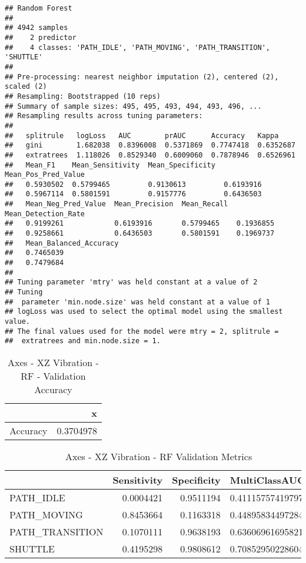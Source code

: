 \documentclass[]{article}
\begin{document}
\begin{verbatim}
## Random Forest 
## 
## 4942 samples
##    2 predictor
##    4 classes: 'PATH_IDLE', 'PATH_MOVING', 'PATH_TRANSITION', 'SHUTTLE' 
## 
## Pre-processing: nearest neighbor imputation (2), centered (2), scaled (2) 
## Resampling: Bootstrapped (10 reps) 
## Summary of sample sizes: 495, 495, 493, 494, 493, 496, ... 
## Resampling results across tuning parameters:
## 
##   splitrule   logLoss   AUC        prAUC      Accuracy   Kappa    
##   gini        1.682038  0.8396008  0.5371869  0.7747418  0.6352687
##   extratrees  1.118026  0.8529340  0.6009060  0.7878946  0.6526961
##   Mean_F1    Mean_Sensitivity  Mean_Specificity  Mean_Pos_Pred_Value
##   0.5930502  0.5799465         0.9130613         0.6193916          
##   0.5967114  0.5801591         0.9157776         0.6436503          
##   Mean_Neg_Pred_Value  Mean_Precision  Mean_Recall  Mean_Detection_Rate
##   0.9199261            0.6193916       0.5799465    0.1936855          
##   0.9258661            0.6436503       0.5801591    0.1969737          
##   Mean_Balanced_Accuracy
##   0.7465039             
##   0.7479684             
## 
## Tuning parameter 'mtry' was held constant at a value of 2
## Tuning
##  parameter 'min.node.size' was held constant at a value of 1
## logLoss was used to select the optimal model using the smallest value.
## The final values used for the model were mtry = 2, splitrule =
##  extratrees and min.node.size = 1.
\end{verbatim}

\begin{table}[!h]

\caption{\label{tab:sensor-xz-vib-rf-results}Axes - XZ Vibration - RF - Validation Accuracy}
\centering
\begin{tabular}[t]{lr}
\toprule
  & x\\
\midrule
Accuracy & 0.3704978\\
\bottomrule
\end{tabular}
\end{table}

\begin{table}[!h]

\caption{\label{tab:sensor-xz-vib-rf-results}Axes - XZ Vibration - RF Validation Metrics}
\centering
\begin{tabular}[t]{lrrl}
\toprule
  & Sensitivity & Specificity & MultiClassAUC\\
\midrule
PATH\_IDLE & 0.0004421 & 0.9511194 & 0.411157574197976\\
PATH\_MOVING & 0.8453664 & 0.1163318 & 0.448958344972847\\
PATH\_TRANSITION & 0.1070111 & 0.9638193 & 0.636069616958212\\
SHUTTLE & 0.4195298 & 0.9808612 & 0.708529502286045\\
\bottomrule
\end{tabular}
\end{table}
\end{document}
